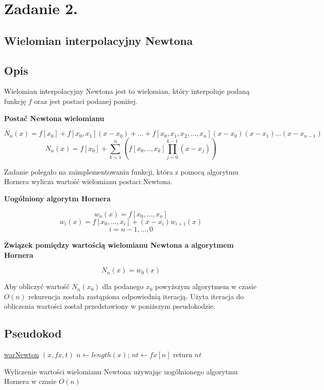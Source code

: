 \documentclass[11pt, a4paper]{article}
\begin{document}
    \section{Zadanie 2.}
    \subsection{Wielomian interpolacyjny Newtona}
    \subsection{Opis}
    Wielomian interpolacyjny Newtona jest to wielomian, który interpoluje podaną funkcję $f$ oraz jest postaci podanej poniżej.\\
    \centerline{\textbf{Postać Newtona wielomianu}}
    $$ N_{n}(x) = f[x_{0}] + f[x_{0}, x_{1}](x - x_{0}) + ... + f[x_{0}, x_{1}, x_{2},...,x_{n}](x - x_{0})(x - x_{1})...(x - x_{n-1})$$
    $$ N_{n}(x) = f[x_{0}] + \sum_{k=1}^{n} (f[x_{0},.., x_{k}]\prod_{j=0}^{k-1} (x - x_{j}))$$

    Zadanie polegało na zaimplementowaniu funkcji, która z pomocą algorytmu Hornera wylicza wartość wielomianu postaci Newtona.\\
    \centerline{\textbf{Uogólniony algorytm Hornera}}
    $$ w_{n}(x) = f[x_{0},...,x_{n}]$$
    $$ w_{i}(x) = f[x_{0},...,x_{i}] + (x - x_{i})w_{i+1}(x)$$
    $$i = n-1,...,0$$
    \centerline{\textbf{Związek pomiędzy wartością wielomianu Newtona a algorytmem Hornera}}
    $$ N_{n}(x) = w_{0}(x)$$

    Aby obliczyć wartość $N_{n}(x_{0})$ dla podanego $x_{0}$ powyższym algorytmem w czasie $O(n)$ rekurencja została zastąpiona odpowiednią iteracją. Użyta iteracja do obliczenia wartości został przedstawiony w poniższym pseudokodzie.

    \subsection{Pseudokod}
    \begin{algorithm}[H]

        \underline{warNewton} $(x , fx,t)$\;
        $n \gets length(x)$; $nt \gets fx[n]$\;
        return $nt$\;
        \caption{Wyliczenie wartości wielomianu Newtona używając uogólnionego algorytmu Hornera w czasie $O(n)$}
    \end{algorithm}
\end{document}
